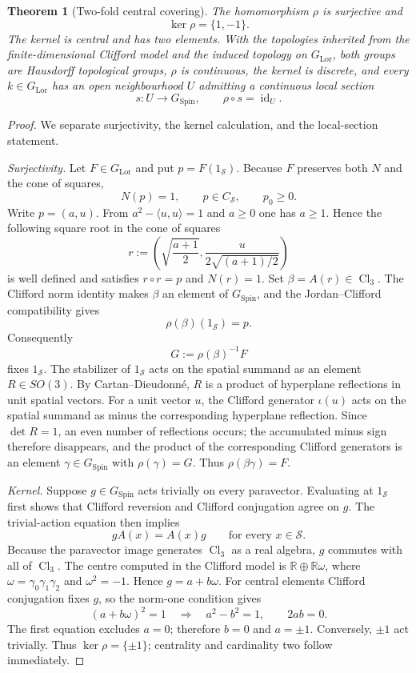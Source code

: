 \documentclass[11pt,a4paper]{article}
\newtheorem{theorem}{Theorem}[section]
\theoremstyle{definition}
\theoremstyle{remark}
\newcommand{\R}{\mathbb{R}}
\newcommand{\Smodel}{\mathcal{S}}
\newcommand{\Cl}{\operatorname{Cl}}
\newcommand{\SpinG}{G_{\mathrm{Spin}}}
\newcommand{\LorG}{G_{\mathrm{Lor}}}
\newcommand{\id}{\operatorname{id}}
\begin{document}
\begin{theorem}[Two-fold central covering]
\label{thm:double-cover}
The homomorphism \(\rho\) is surjective and
\[
   \ker\rho=\{1,-1\}.
\tag{3.9}
\]
The kernel is central and has two elements.  With the topologies inherited
from the finite-dimensional Clifford model and the induced topology on
\(\LorG\), both groups are Hausdorff topological groups, \(\rho\) is
continuous, the kernel is discrete, and every \(k\in\LorG\) has an open
neighbourhood \(U\) admitting a continuous local section
\[
   s:U\longrightarrow\SpinG,
   \qquad
   \rho\circ s=\id_{U}.
\tag{3.10}
\]
\end{theorem}

\begin{proof}
We separate surjectivity, the kernel calculation, and the local-section
statement.

\emph{Surjectivity.}  Let \(F\in\LorG\) and put \(p=F(1_{\Smodel})\).
Because \(F\) preserves both \(N\) and the cone of squares,
\[
    N(p)=1,
    \qquad
    p\in C_{\Smodel},
    \qquad
    p_0\ge 0.
\]
Write \(p=(a,u)\).  From \(a^2-\langle u,u\rangle=1\) and \(a\ge0\) one
has \(a\ge1\).  Hence the following square root in the cone of squares
\[
 r:=\left(\sqrt{\frac{a+1}{2}},
      \frac{u}{2\sqrt{(a+1)/2}}\right)
\]
is well defined and satisfies \(r\circ r=p\) and \(N(r)=1\).  Set
\(\beta=A(r)\in\Cl_3\).  The Clifford norm identity makes \(\beta\) an element of \(\SpinG\), and the Jordan--Clifford compatibility gives
\[
   \rho(\beta)(1_{\Smodel})=p.
\]
Consequently
\[
   G:=\rho(\beta)^{-1}F
\]
fixes \(1_{\Smodel}\).  The stabilizer of \(1_{\Smodel}\) acts on the
spatial summand as an element \(R\in SO(3)\).  By Cartan--Dieudonn\'e,
\(R\) is a product of hyperplane reflections in unit spatial vectors.
For a unit vector \(u\), the Clifford generator \(\iota(u)\) acts on the
spatial summand as minus the corresponding hyperplane reflection.  Since
\(\det R=1\), an even number of reflections occurs; the accumulated minus
sign therefore disappears, and the product of the corresponding Clifford
generators is an element \(\gamma\in\SpinG\) with \(\rho(\gamma)=G\).  Thus
\(\rho(\beta\gamma)=F\).

\emph{Kernel.}  Suppose \(g\in\SpinG\) acts trivially on every paravector.
Evaluating at \(1_{\Smodel}\) first shows that Clifford reversion and
Clifford conjugation agree on \(g\).  The trivial-action equation then
implies
\[
    gA(x)=A(x)g
    \qquad\text{for every }x\in\Smodel.
\]
Because the paravector image generates \(\Cl_3\) as a real algebra, \(g\)
commutes with all of \(\Cl_3\).  The centre computed in the Clifford model is
\(\R\oplus\R\omega\), where
\(\omega=\gamma_0\gamma_1\gamma_2\) and \(\omega^2=-1\).  Hence
\(g=a+b\omega\).  For central elements Clifford conjugation fixes \(g\),
so the norm-one condition gives
\[
   (a+b\omega)^2=1
   \quad\Longrightarrow\quad
   a^2-b^2=1,
   \qquad
   2ab=0.
\]
The first equation excludes \(a=0\); therefore \(b=0\) and
\(a=\pm1\).  Conversely, \(\pm1\) act trivially.  Thus
\(\ker\rho=\{\pm1\}\); centrality and cardinality two follow immediately.


\end{proof}
\end{document}
